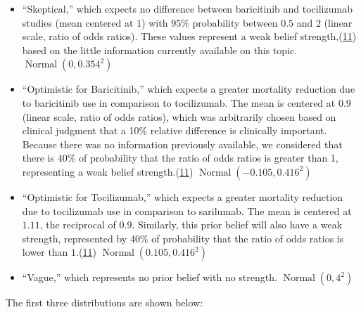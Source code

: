 \documentclass[
  12pt,
]{article}
\begin{document}
\begin{itemize}
\item
  ``Skeptical,'' which expects no difference between baricitinib and
  tocilizumab studies (mean centered at \(1\)) with \(95\%\) probability
  between \(0.5\) and \(2\) (linear scale, ratio of odds ratios). These
  values represent a weak belief
  strength,(\protect\hyperlink{ref-zampieri2021}{11}) based on the
  little information currently available on this topic.
  \(\operatorname{Normal}(0, 0.354^2)\)
\item
  ``Optimistic for Baricitinib,'' which expects a greater mortality
  reduction due to baricitinib use in comparison to tocilizumab. The
  mean is centered at \(0.9\) (linear scale, ratio of odds ratios),
  which was arbitrarily chosen based on clinical judgment that a 10\%
  relative difference is clinically important. Because there was no
  information previously available, we considered that there is 40\% of
  probability that the ratio of odds ratios is greater than 1,
  representing a weak belief
  strength.(\protect\hyperlink{ref-zampieri2021}{11})
  \(\operatorname{Normal}(-0.105, 0.416^2)\)
\item
  ``Optimistic for Tocilizumab,'' which expects a greater mortality
  reduction due to tocilizumab use in comparison to sarilumab. The mean
  is centered at \(1.11\), the reciprocal of \(0.9\). Similarly, this
  prior belief will also have a weak strength, represented by 40\% of
  probability that the ratio of odds ratios is lower than
  \(1\).(\protect\hyperlink{ref-zampieri2021}{11})
  \(\operatorname{Normal}(0.105, 0.416^2)\)
\item
  ``Vague,'' which represents no prior belief with no strength.
  \(\operatorname{Normal}(0, 4^2)\)
\end{itemize}

The first three distributions are shown below:
\end{document}
